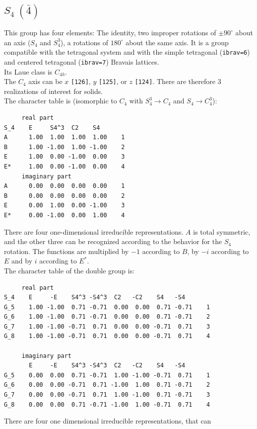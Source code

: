 \documentclass[12pt,a4paper]{article}
\begin{document}
\newpage
\subsection{\color{web-blue}$S_4\ (\bar 4)$}  
This group has four elements: The identity, two improper rotations 
of $\pm90^\circ$ about an axis ($S_4$ and $S_4^3$),  
a rotations of $180^\circ$ about the same axis. 
It is a group compatible with the tetragonal system and with the  
simple tetragonal (\texttt{ibrav=6}) and centered tetragonal 
(\texttt{ibrav=7}) Bravais lattices. \\
Its Laue class is $C_{4h}$. \\
The $C_4$ axis can be $x$ \texttt{[126]}, $y$ \texttt{[125]}, 
or $z$ \texttt{[124]}. There are therefore $3$ realizations
of interest for solids. \\ 
The character table is (isomorphic to $C_4$ with $S_4^3 \rightarrow C_4$ and
$S_4 \rightarrow C_4^3$):
\begin{verbatim}
     real part
S_4    E     S4^3  C2    S4   
A      1.00  1.00  1.00  1.00    1
B      1.00 -1.00  1.00 -1.00    2
E      1.00  0.00 -1.00  0.00    3
E*     1.00  0.00 -1.00  0.00    4
     imaginary part
A      0.00  0.00  0.00  0.00    1
B      0.00  0.00  0.00  0.00    2
E      0.00  1.00  0.00 -1.00    3
E*     0.00 -1.00  0.00  1.00    4
\end{verbatim}
There are four one-dimensional irreducible representations. $A$ is total
symmetric, and the other three can be recognized according to the behavior
for the $S_4$ rotation. The functions are multiplied by $-1$ according to
$B$, by $-i$ according to $E$ and by $i$ according to $E^*$.\\
The character table of the double group is:
\begin{verbatim}
     real part
S_4    E     -E    S4^3 -S4^3  C2   -C2    S4   -S4  
G_5    1.00 -1.00  0.71 -0.71  0.00  0.00  0.71 -0.71    1
G_6    1.00 -1.00  0.71 -0.71  0.00  0.00  0.71 -0.71    2
G_7    1.00 -1.00 -0.71  0.71  0.00  0.00 -0.71  0.71    3
G_8    1.00 -1.00 -0.71  0.71  0.00  0.00 -0.71  0.71    4

     imaginary part
       E     -E    S4^3 -S4^3  C2   -C2    S4   -S4  
G_5    0.00  0.00  0.71 -0.71  1.00 -1.00 -0.71  0.71    1
G_6    0.00  0.00 -0.71  0.71 -1.00  1.00  0.71 -0.71    2
G_7    0.00  0.00 -0.71  0.71  1.00 -1.00  0.71 -0.71    3
G_8    0.00  0.00  0.71 -0.71 -1.00  1.00 -0.71  0.71    4
\end{verbatim}
There are four one dimensional irreducible representations, that can
\end{document}
